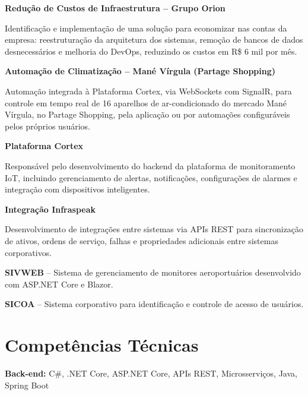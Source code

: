 \documentclass[11pt,a4paper]{article}
\begin{document}
\textbf{Redução de Custos de Infraestrutura -- Grupo Orion}

Identificação e implementação de uma solução para economizar nas contas da empresa: reestruturação da arquitetura dos sistemas, remoção de bancos de dados desnecessários e melhoria do DevOps, reduzindo os custos em R\$ 6 mil por mês.

\vspace{0.2cm}

\textbf{Automação de Climatização -- Mané Vírgula (Partage Shopping)}

Automação integrada à Plataforma Cortex, via WebSockets com SignalR, para controle em tempo real de 16 aparelhos de ar-condicionado do mercado Mané Vírgula, no Partage Shopping, pela aplicação ou por automações configuráveis pelos próprios usuários.

\vspace{0.2cm}

\textbf{Plataforma Cortex}

Responsável pelo desenvolvimento do backend da plataforma de monitoramento IoT, incluindo gerenciamento de alertas, notificações, configurações de alarmes e integração com dispositivos inteligentes.

\vspace{0.2cm}

\textbf{Integração Infraspeak}

Desenvolvimento de integrações entre sistemas via APIs REST para sincronização de ativos, ordens de serviço, falhas e propriedades adicionais entre sistemas corporativos.

\vspace{0.2cm}

\textbf{SIVWEB} -- Sistema de gerenciamento de monitores aeroportuários desenvolvido com ASP.NET Core e Blazor.

\vspace{0.2cm}

\textbf{SICOA} -- Sistema corporativo para identificação e controle de acesso de usuários.

\section{Competências Técnicas}

\textbf{Back-end:} C\#, .NET Core, ASP.NET Core, APIs REST, Microsserviços, Java, Spring Boot

\vspace{0.12cm}
\end{document}
